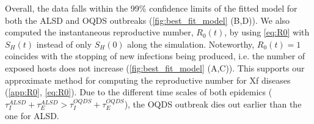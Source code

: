 \begin{table}[H]
    \centering
    \caption[Estimated parameters of the model for OQDS in Apulia]{Estimated
        epidemiological parameters from Bayesian model
        fitting to the disease progression curve of OQDS in Apulia.}
    \label{tab:parameter_estimates_OQDS}
\end{table}

Overall, the data falls within the 99\% confidence limits of the fitted
model for both the ALSD and OQDS outbreaks (\cref{fig:best_fit_model} (B,D)).
We
also computed the instantaneous reproductive number, $R_0(t)$, by using
\cref{eq:R0} with $S_H(t)$ instead of only $S_H(0)$ along the simulation.
Noteworthy, $R_0(t)=1$ coincides with the stopping of new infections being
produced, i.e. the number of exposed hosts does not increase
(\cref{fig:best_fit_model} (A,C)). This supports our approximate method for
computing the reproductive number for Xf diseases (\cref{app:R0},
\cref{eq:R0}). Due to the different time scales of both epidemics
($\tau_I^{ALSD}+\tau_E^{ALSD} > \tau_I^{OQDS}+\tau_E^{OQDS}$), the OQDS
outbreak dies out earlier than the one for ALSD.

